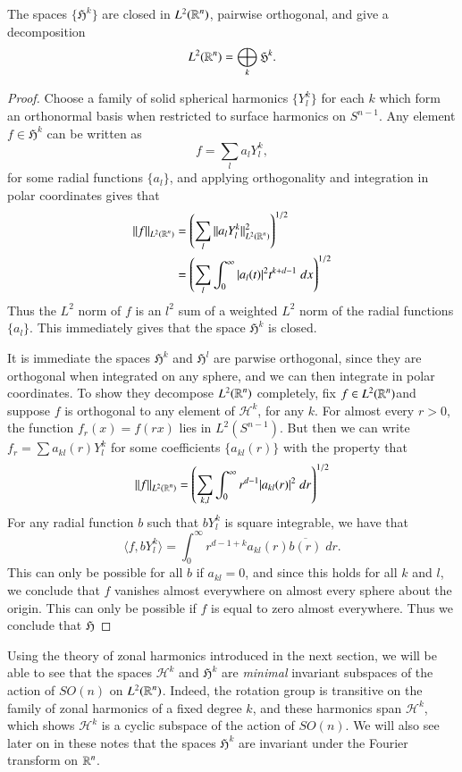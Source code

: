 \begin{theorem}
    The spaces $\{ \mathfrak{H}^k \}$ are closed in $L^2(\operatorname{\mathbb{R}}^n)$, pairwise orthogonal, and give a decomposition
    \[ L^2(\operatorname{\mathbb{R}}^n) = \bigoplus_k \mathfrak{H}^k. \]
\end{theorem}
\begin{proof}
    Choose a family of solid spherical harmonics $\{ Y^k_l \}$ for each $k$ which form an orthonormal basis when restricted to surface harmonics on $S^{n-1}$. Any element $f \in \mathfrak{H}^k$ can be written as
    \[ f = \sum_l a_l Y^k_l, \]
    for some radial functions $\{ a_l \}$, and applying orthogonality and integration in polar coordinates gives that
    \begin{align*}
        \| f \|_{L^2(\operatorname{\mathbb{R}}^n)} &= \left( \sum_l \| a_l Y^k_l \|_{L^2(\operatorname{\mathbb{R}}^n)}^2 \right)^{1/2}\\
        &= \left( \sum_l \int_0^\infty |a_l(t)|^2 t^{k + d-1}\; dx \right)^{1/2}
    \end{align*}
    Thus the $L^2$ norm of $f$ is an $l^2$ sum of a weighted $L^2$ norm of the radial functions $\{ a_l \}$. This immediately gives that the space $\mathfrak{H}^k$ is closed.

    It is immediate the spaces $\mathfrak{H}^k$ and $\mathfrak{H}^l$ are parwise orthogonal, since they are orthogonal when integrated on any sphere, and we can then integrate in polar coordinates. To show they decompose $L^2(\operatorname{\mathbb{R}}^n)$ completely, fix $f \in L^2(\operatorname{\mathbb{R}}^n)$and suppose $f$ is orthogonal to any element of $\mathcal{H}^k$, for any $k$. For almost every $r > 0$, the function $f_r(x) = f(rx)$ lies in $L^2(S^{n-1})$. But then we can write $f_r = \sum a_{kl}(r) Y^k_l$ for some coefficients $\{ a_{kl}(r) \}$ with the property that
    \[ \| f \|_{L^2(\operatorname{\mathbb{R}}^n)} = \left( \sum_{k,l} \int_0^\infty r^{d-1} |a_{kl}(r)|^2\; dr \right)^{1/2} \]
    For any radial function $b$ such that $b Y^k_l$ is square integrable, we have that
    \[ \langle f, b Y^k_l \rangle = \int_0^\infty r^{d-1+k} a_{kl}(r) \overline{b(r)}\; dr. \]
    This can only be possible for all $b$ if $a_{kl} = 0$, and since this holds for all $k$ and $l$, we conclude that $f$ vanishes almost everywhere on almost every sphere about the origin. This can only be possible if $f$ is equal to zero almost everywhere. Thus we conclude that $\mathfrak{H}$
\end{proof}

Using the theory of zonal harmonics introduced in the next section, we will be able to see that the spaces $\mathcal{H}^k$ and $\mathfrak{H}^k$ are \emph{minimal} invariant subspaces of the action of $SO(n)$ on $L^2(\operatorname{\mathbb{R}}^n)$. Indeed, the rotation group is transitive on the family of zonal harmonics of a fixed degree $k$, and these harmonics span $\mathcal{H}^k$, which shows $\mathcal{H}^k$ is a cyclic subspace of the action of $SO(n)$. We will also see later on in these notes that the spaces $\mathfrak{H}^k$ are invariant under the Fourier transform on $\operatorname{\mathbb{R}}^n$.

